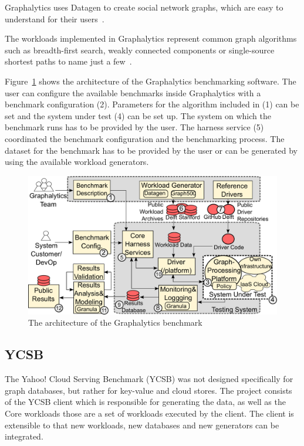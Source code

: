 Graphalytics uses Datagen to create social network graphs,
which are easy to understand for their users~\cite[3]{Capota2015c}.

The workloads implemented in Graphalytics represent common graph algorithms such as breadth-first search,
weakly connected components or single-source shortest paths to name just a few~\cite[7]{Iosup}.

Figure~\ref{fig:graphalyticsArchitecture} shows the architecture of the Graphalytics benchmarking software.
The user can configure the available benchmarks inside Graphalytics with a benchmark configuration (2).
Parameters for the algorithm included in (1) can be set and the system under test (4) can be set up.
The system on which the benchmark runs has to be provided by the user.
The harness service (5) coordinated the benchmark configuration and the benchmarking process.
The dataset for the benchmark has to be provided by the user or can be generated by using the available workload generators.\cite[11]{Iosup}
\pagebreak

\begin{figure}[h!]
  \centering
  \includegraphics[width=.75\textwidth]{images/benchmarks/GraphalyticsArchitecture}
  \caption{The architecture of the Graphalytics benchmark\cite[11]{Iosup}}
  \label{fig:graphalyticsArchitecture}
\end{figure}

\subsection{YCSB}
\label{ch:background:se:ycsb}
The Yahoo! Cloud Serving Benchmark (YCSB) was not designed specifically for graph databases,
but rather for key-value and cloud stores.
The project consists of the YCSB client which is responsible for generating the data,
as well as the Core workloads those are a set of workloads executed by the client.
The client is extensible to that new workloads,
new databases and new generators can be integrated.~\cite{Yahoo!2010}

